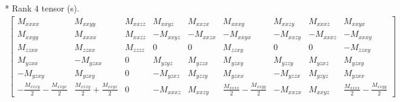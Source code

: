 \documentclass[fleqn,8pt,landscape]{jsarticle}
\begin{document}
* Rank 4 tensor (s).
\begin{align*}
\begin{bmatrix} M_{xxxx} & M_{xxyy} & M_{xxzz} & M_{xxyz} & M_{xxzx} & M_{xxxy} & M_{xxzy} & M_{xxxz} & M_{xxyx} \\ M_{xxyy} & M_{xxxx} & M_{xxzz} & - M_{xxyz} & - M_{xxzx} & - M_{xxyx} & - M_{xxzy} & - M_{xxxz} & - M_{xxxy} \\ M_{zzxx} & M_{zzxx} & M_{zzzz} & 0 & 0 & M_{zzxy} & 0 & 0 & - M_{zzxy} \\ M_{yzxx} & - M_{yzxx} & 0 & M_{yzyz} & M_{yzzx} & M_{yzxy} & M_{yzzy} & M_{yzxz} & M_{yzxy} \\ - M_{yzxy} & M_{yzxy} & 0 & - M_{yzxz} & M_{yzzy} & M_{yzxx} & - M_{yzzx} & M_{yzyz} & M_{yzxx} \\ - \frac{M_{xxxy}}{2} - \frac{M_{xxyx}}{2} & \frac{M_{xxxy}}{2} + \frac{M_{xxyx}}{2} & 0 & - M_{xxxz} & M_{xxzy} & \frac{M_{xxxx}}{2} - \frac{M_{xxyy}}{2} & - M_{xxzx} & M_{xxyz} & \frac{M_{xxxx}}{2} - \frac{M_{xxyy}}{2} \end{bmatrix}
\end{align*}
\end{document}
